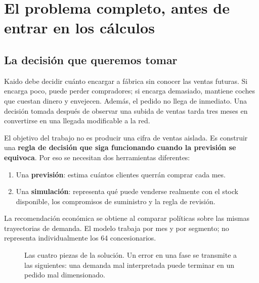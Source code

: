 \section{El problema completo, antes de entrar en los cálculos}\label{sec:mapa}

\subsection{La decisión que queremos tomar}
Kaido debe decidir cuánto encargar a fábrica sin conocer las ventas futuras.
Si encarga poco, puede perder compradores; si encarga demasiado, mantiene coches
que cuestan dinero y envejecen. Además, el pedido no llega de inmediato. Una
decisión tomada después de observar una subida de ventas tarda tres meses en
convertirse en una llegada modificable a la red.

El objetivo del trabajo no es producir una cifra de ventas aislada. Es construir
una \textbf{regla de decisión que siga funcionando cuando la previsión se
equivoca}. Por eso se necesitan dos herramientas diferentes:
\begin{enumerate}
  \item Una \textbf{previsión}: estima cuántos clientes querrán comprar cada mes.
  \item Una \textbf{simulación}: representa qué puede venderse realmente con el
  stock disponible, los compromisos de suministro y la regla de revisión.
\end{enumerate}
La recomendación económica se obtiene al comparar políticas sobre las mismas
trayectorias de demanda. El modelo trabaja por mes y por segmento; no representa
individualmente los 64 concesionarios.

\begin{figure}[htbp]
\centering
{}
\caption{Las cuatro piezas de la solución. Un error en una fase se transmite a
las siguientes: una demanda mal interpretada puede terminar en un pedido mal dimensionado.}
\label{fig:proceso}
\end{figure}

